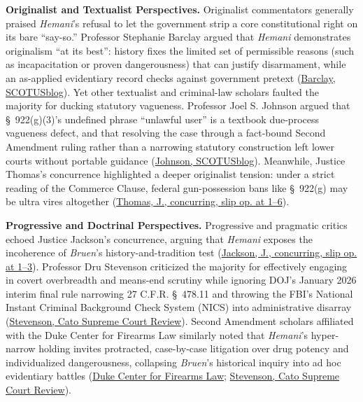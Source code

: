 \documentclass[12pt]{article}
\begin{document}
\textbf{Originalist and Textualist Perspectives.} Originalist commentators generally praised \textit{Hemani}'s refusal to let the government strip a core constitutional right on its bare ``say-so.'' Professor Stephanie Barclay argued that \textit{Hemani} demonstrates originalism ``at its best'': history fixes the limited set of permissible reasons (such as incapacitation or proven dangerousness) that can justify disarmament, while an as-applied evidentiary record checks against government pretext (\href{https://www.scotusblog.com/2026/06/hemani-proving-the-reason-not-just-naming-it/}{Barclay, SCOTUSblog}). Yet other textualist and criminal-law scholars faulted the majority for ducking statutory vagueness. Professor Joel S. Johnson argued that \S~922(g)(3)'s undefined phrase ``unlawful user'' is a textbook due-process vagueness defect, and that resolving the case through a fact-bound Second Amendment ruling rather than a narrowing statutory construction left lower courts without portable guidance (\href{https://www.scotusblog.com/2026/06/a-victory-for-the-defendant-in-united-states-v-hemani-but-little-guidance-for-the-lower-courts/}{Johnson, SCOTUSblog}). Meanwhile, Justice Thomas's concurrence highlighted a deeper originalist tension: under a strict reading of the Commerce Clause, federal gun-possession bans like \S~922(g) may be ultra vires altogether (\href{https://supreme.justia.com/cases/federal/us/608/24-1234/}{Thomas, J., concurring, slip op. at 1--6}).

\textbf{Progressive and Doctrinal Perspectives.} Progressive and pragmatic critics echoed Justice Jackson's concurrence, arguing that \textit{Hemani} exposes the incoherence of \textit{Bruen}'s history-and-tradition test (\href{https://supreme.justia.com/cases/federal/us/608/24-1234/}{Jackson, J., concurring, slip op. at 1--3}). Professor Dru Stevenson criticized the majority for effectively engaging in covert overbreadth and means-end scrutiny while ignoring DOJ's January 2026 interim final rule narrowing 27 C.F.R. \S~478.11 and throwing the FBI's National Instant Criminal Background Check System (NICS) into administrative disarray (\href{https://www.cato.org/sites/cato.org/files/2026-09/2025-2026-Supreme-Court-Review-7.pdf}{Stevenson, Cato Supreme Court Review}). Second Amendment scholars affiliated with the Duke Center for Firearms Law similarly noted that \textit{Hemani}'s hyper-narrow holding invites protracted, case-by-case litigation over drug potency and individualized dangerousness, collapsing \textit{Bruen}'s historical inquiry into ad hoc evidentiary battles (\href{https://firearmslaw.duke.edu/2026/03/breaking-down-the-hemani-arguments}{Duke Center for Firearms Law}; \href{https://www.cato.org/sites/cato.org/files/2026-09/2025-2026-Supreme-Court-Review-7.pdf}{Stevenson, Cato Supreme Court Review}).
\end{document}
